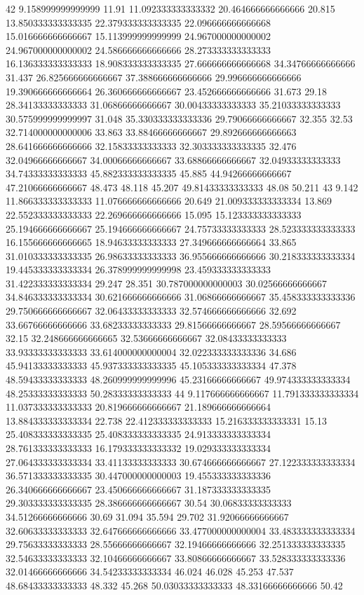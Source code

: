 42 9.158999999999999 11.91 11.092333333333332 20.464666666666666 20.815 13.850333333333335 22.379333333333335 22.096666666666668 15.016666666666667 15.113999999999999 24.967000000000002 24.967000000000002 24.586666666666666 28.273333333333333 16.136333333333333 18.908333333333335 27.666666666666668 34.34766666666666 31.437 26.825666666666667 37.388666666666666 29.996666666666666 19.390666666666664 26.360666666666667 23.452666666666666 31.673 29.18 28.34133333333333 31.06866666666667 30.00433333333333 35.21033333333333 30.575999999999997 31.048 35.330333333333336 29.79066666666667 32.355 32.53 32.714000000000006 33.863 33.88466666666667 29.892666666666663 28.641666666666666 32.15833333333333 32.303333333333335 32.476 32.04966666666667 34.00066666666667 33.68866666666667 32.04933333333333 34.74333333333333 45.882333333333335 45.885 44.94266666666667 47.21066666666667 48.473 48.118 45.207 49.81433333333333 48.08 50.211
43 9.142 11.866333333333333 11.076666666666666 20.649 21.009333333333334 13.869 22.552333333333333 22.269666666666666 15.095 15.123333333333333 25.194666666666667 25.194666666666667 24.75733333333333 28.523333333333333 16.155666666666665 18.94633333333333 27.349666666666664 33.865 31.010333333333335 26.98633333333333 36.955666666666666 30.218333333333334 19.445333333333334 26.378999999999998 23.459333333333333 31.422333333333334 29.247 28.351 30.787000000000003 30.02566666666667 34.846333333333334 30.621666666666666 31.06866666666667 35.458333333333336 29.750666666666667 32.06433333333333 32.574666666666666 32.692 33.66766666666666 33.68233333333333 29.81566666666667 28.59566666666667 32.15 32.248666666666665 32.53666666666667 32.08433333333333 33.93333333333333 33.614000000000004 32.022333333333336 34.686 45.94133333333333 45.937333333333335 45.105333333333334 47.378 48.59433333333333 48.260999999999996 45.23166666666667 49.974333333333334 48.25333333333333 50.28333333333333
44 9.117666666666667 11.791333333333334 11.037333333333333 20.819666666666667 21.189666666666664 13.884333333333334 22.738 22.412333333333333 15.216333333333331 15.13 25.408333333333335 25.408333333333335 24.913333333333334 28.761333333333333 16.179333333333332 19.029333333333334 27.064333333333334 33.41133333333333 30.674666666666667 27.122333333333334 36.571333333333335 30.447000000000003 19.455333333333336 26.340666666666667 23.450666666666667 31.187333333333335 29.303333333333335 28.386666666666667 30.54 30.06833333333333 34.51266666666666 30.69 31.094 35.594 29.702 31.92066666666667 32.60633333333333 32.647666666666666 33.477000000000004 33.483333333333334 29.75633333333333 28.55666666666667 32.19466666666666 32.251333333333335 32.54633333333333 32.10466666666667 33.80866666666667 33.528333333333336 32.01466666666666 34.54233333333334 46.024 46.028 45.253 47.537 48.68433333333333 48.332 45.268 50.03033333333333 48.33166666666666 50.42

